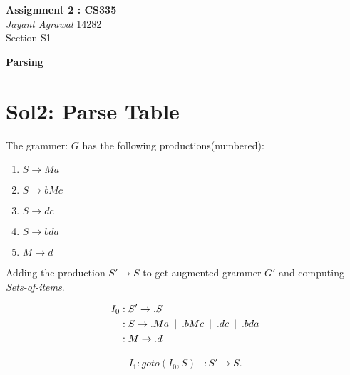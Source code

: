 \documentclass{article}
\newcommand\tab[1][5pt]{\hspace*{#1}}
\begin{document}

\begin{center}
\textbf{\huge Assignment 2 : CS335} \\
\textit{\Large Jayant Agrawal}         14282 \\
Section S1
\end{center}

\textbf{\huge Parsing}

\section*{Sol2: Parse Table}
The grammer: $G$ has the following productions(numbered):
\begin{enumerate}
\item $S \rightarrow Ma$
\item $S \rightarrow bMc$
\item $S \rightarrow dc$
\item $S \rightarrow bda$
\item $M \rightarrow d$
\end{enumerate}
Adding the production $S' \rightarrow S$ to get augmented grammer $G'$ and computing \emph{Sets-of-items}.
\begin{multicols}{2}
\begin{equation*}
\begin{aligned}
I_0 &: S' \rightarrow .S  \\
&: S \rightarrow .Ma \hspace{5pt} | \tab .bMc \tab | \tab .dc \tab | \tab .bda \\
&: M \rightarrow .d
\end{aligned}
\end{equation*}

\begin{equation*}
\begin{aligned}
I_1 : goto(I_0,S) &: S' \rightarrow S.  \\
\end{aligned}
\end{equation*}


\end{multicols}
 	
\end{document}
